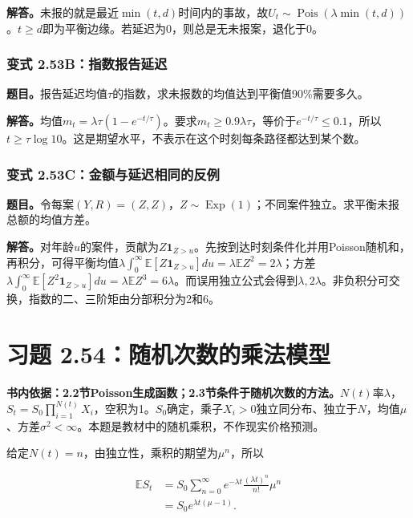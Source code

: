\documentclass[12pt,a4paper,UTF8,fontset=fandol]{ctexart}
\begin{document}
\textbf{解答。}未报的就是最近\(\min(t,d)\)时间内的事故，故\(U_t\sim\operatorname{Pois}(\lambda\min(t,d))\)。\(t\ge d\)即为平衡边缘。若延迟为0，则总是无未报案，退化于0。

\subsubsection{变式
2.53B：指数报告延迟}\label{ux53d8ux5f0f-2.53bux6307ux6570ux62a5ux544aux5ef6ux8fdf}

\textbf{题目。}报告延迟均值\(\tau\)的指数，求未报数的均值达到平衡值90\%需要多久。

\textbf{解答。}均值\(m_t=\lambda\tau(1-e^{-t/\tau})\)。要求\(m_t\ge0.9\lambda\tau\)，等价于\(e^{-t/\tau}\le0.1\)，所以\(t\ge\tau\log10\)。这是期望水平，不表示在这个时刻每条路径都达到某个数。

\subsubsection{变式
2.53C：金额与延迟相同的反例}\label{ux53d8ux5f0f-2.53cux91d1ux989dux4e0eux5ef6ux8fdfux76f8ux540cux7684ux53cdux4f8b}

\textbf{题目。}令每案\((Y,R)=(Z,Z)\)，\(Z\sim\operatorname{Exp}(1)\)；不同案件独立。求平衡未报总额的均值方差。

\textbf{解答。}对年龄\(u\)的案件，贡献为\(Z\mathbf1_{Z>u}\)。先按到达时刻条件化并用Poisson随机和，再积分，可得平衡均值\(\lambda\int_0^\infty\mathbb E[Z\mathbf1_{Z>u}]du=\lambda\mathbb EZ^2=2\lambda\)；方差\(\lambda\int_0^\infty\mathbb E[Z^2\mathbf1_{Z>u}]du=\lambda\mathbb EZ^3=6\lambda\)。而误用独立公式会得到\(\lambda,2\lambda\)。非负积分可交换，指数的二、三阶矩由分部积分为2和6。

\section{习题
2.54：随机次数的乘法模型}\label{ux4e60ux9898-2.54ux968fux673aux6b21ux6570ux7684ux4e58ux6cd5ux6a21ux578b}

\textbf{书内依据：2.2节Poisson生成函数；2.3节条件于随机次数的方法。}\(N(t)\)率\(\lambda\)，\(S_t=S_0\prod_{i=1}^{N(t)}X_i\)，空积为1。\(S_0\)确定，乘子\(X_i>0\)独立同分布、独立于\(N\)，均值\(\mu\)、方差\(\sigma^2<\infty\)。本题是教材中的随机乘积，不作现实价格预测。

给定\(N(t)=n\)，由独立性，乘积的期望为\(\mu^n\)，所以

\[
\begin{aligned}
\mathbb ES_t
&=S_0\sum_{n=0}^\infty e^{-\lambda t}\frac{(\lambda t)^n}{n!}\mu^n\\
&=\boxed{S_0e^{\lambda t(\mu-1)}}.
\end{aligned}
\]
\end{document}
